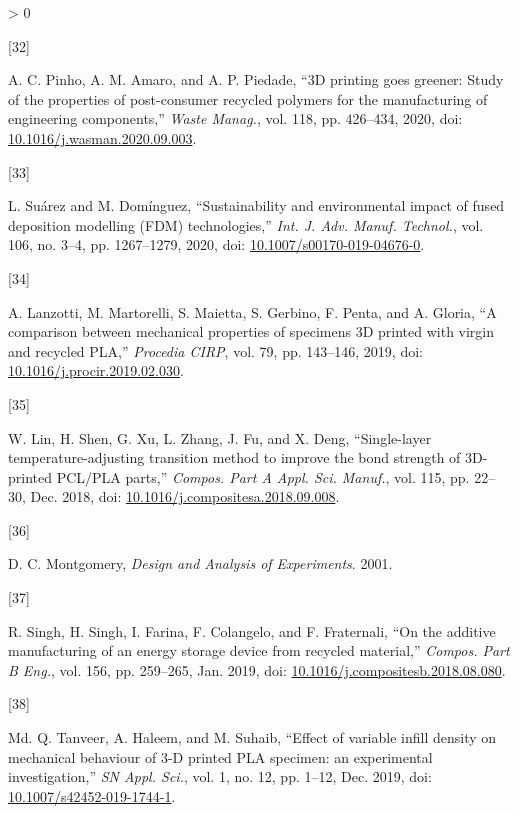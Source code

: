\documentclass[conference,final,]{IEEEtran}
\newlength{\csllabelwidth}
\newlength{\cslhangindent}
\newenvironment{CSLReferences}[3] %
 {%
  \setlength{\parindent}{0pt}
  \ifodd #1 \everypar{\setlength{\hangindent}{\cslhangindent}}\ignorespaces\fi
  \ifnum #2 > 0
  \setlength{\parskip}{#2\baselineskip}
  \fi
 }%
 {}
\newcommand{\CSLLeftMargin}[1]{\parbox[t]{\csllabelwidth}{#1}}
\newcommand{\CSLRightInline}[1]{\parbox[t]{\linewidth - \csllabelwidth}{#1}}
\begin{document}
\begin{CSLReferences}{0}{0}
\leavevmode\hypertarget{ref-Pinho2020}{}%
\CSLLeftMargin{{[}32{]} }
\CSLRightInline{A. C. Pinho, A. M. Amaro, and A. P. Piedade, {``{3D
printing goes greener: Study of the properties of post-consumer recycled
polymers for the manufacturing of engineering components},''}
\emph{Waste Manag.}, vol. 118, pp. 426--434, 2020, doi:
\href{https://doi.org/10.1016/j.wasman.2020.09.003}{10.1016/j.wasman.2020.09.003}.}

\leavevmode\hypertarget{ref-Suarez2020}{}%
\CSLLeftMargin{{[}33{]} }
\CSLRightInline{L. Suárez and M. Domínguez, {``{Sustainability and
environmental impact of fused deposition modelling (FDM)
technologies},''} \emph{Int. J. Adv. Manuf. Technol.}, vol. 106, no.
3--4, pp. 1267--1279, 2020, doi:
\href{https://doi.org/10.1007/s00170-019-04676-0}{10.1007/s00170-019-04676-0}.}

\leavevmode\hypertarget{ref-Lanzotti2019}{}%
\CSLLeftMargin{{[}34{]} }
\CSLRightInline{A. Lanzotti, M. Martorelli, S. Maietta, S. Gerbino, F.
Penta, and A. Gloria, {``{A comparison between mechanical properties of
specimens 3D printed with virgin and recycled PLA},''} \emph{Procedia
CIRP}, vol. 79, pp. 143--146, 2019, doi:
\href{https://doi.org/10.1016/j.procir.2019.02.030}{10.1016/j.procir.2019.02.030}.}

\leavevmode\hypertarget{ref-Lin2018}{}%
\CSLLeftMargin{{[}35{]} }
\CSLRightInline{W. Lin, H. Shen, G. Xu, L. Zhang, J. Fu, and X. Deng,
{``{Single-layer temperature-adjusting transition method to improve the
bond strength of 3D-printed PCL/PLA parts},''} \emph{Compos. Part A
Appl. Sci. Manuf.}, vol. 115, pp. 22--30, Dec. 2018, doi:
\href{https://doi.org/10.1016/j.compositesa.2018.09.008}{10.1016/j.compositesa.2018.09.008}.}

\leavevmode\hypertarget{ref-Montgomery2001}{}%
\CSLLeftMargin{{[}36{]} }
\CSLRightInline{D. C. Montgomery, \emph{{Design and Analysis of
Experiments}}. 2001.}

\leavevmode\hypertarget{ref-Singh2019}{}%
\CSLLeftMargin{{[}37{]} }
\CSLRightInline{R. Singh, H. Singh, I. Farina, F. Colangelo, and F.
Fraternali, {``{On the additive manufacturing of an energy storage
device from recycled material},''} \emph{Compos. Part B Eng.}, vol. 156,
pp. 259--265, Jan. 2019, doi:
\href{https://doi.org/10.1016/j.compositesb.2018.08.080}{10.1016/j.compositesb.2018.08.080}.}

\leavevmode\hypertarget{ref-Tanveer2019}{}%
\CSLLeftMargin{{[}38{]} }
\CSLRightInline{Md. Q. Tanveer, A. Haleem, and M. Suhaib, {``{Effect of
variable infill density on mechanical behaviour of 3-D printed PLA
specimen: an experimental investigation},''} \emph{SN Appl. Sci.}, vol.
1, no. 12, pp. 1--12, Dec. 2019, doi:
\href{https://doi.org/10.1007/s42452-019-1744-1}{10.1007/s42452-019-1744-1}.}


\end{CSLReferences}
\end{document}
